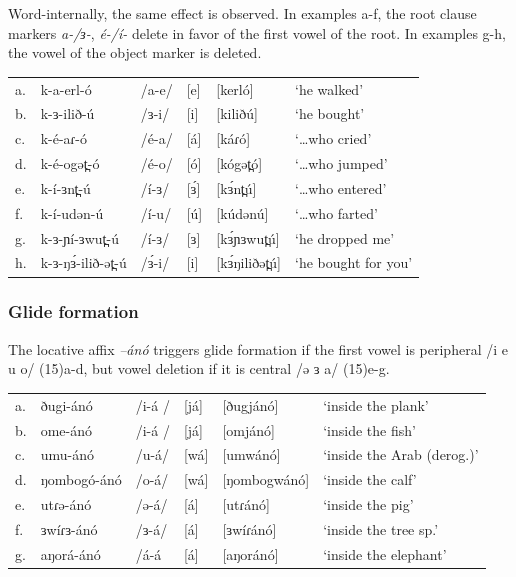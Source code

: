 Word-internally, the same effect is observed. In examples a-f, the root clause markers \textit{a-/ɜ-}, \textit{é-/í-} delete in favor of the first vowel of the root. In examples g-h, the vowel of the object marker is deleted. 

\begin{tabular}[t]{llllll}
a.&	k-a-erl-ó		&	/a-e/&	[e]	&	[kerló]		&	‘he walked’\\
b.&	k-ɜ-ilið-ú		&	/ɜ-i/&	[i]	&	[kiliðú]		&	‘he bought’\\
c.&	k-é-aɾ-ó		&	/é-a/&	[á]	&	[káɾó]		&	‘…who cried’	 \\
d.&	k-é-ogət̪-ó		&	/é-o/&	[ó]	&	[kógət̪ó]	&	‘…who jumped’\\
e.&	k-í-ɜnt̪-ú		&	/í-ɜ/&	[ɜ́]	&	[kɜ́nt̪ú]		&	‘…who entered’\\
f.&	k-í-udən-ú		&	/í-u/&	[ú]	&	[kúdənú]		&	‘…who farted’\\
g.&	k-ɜ-ɲí-ɜwut̪-ú	&	/í-ɜ/&	[ɜ]	&	[kɜ́ɲɜwut̪ú]	&	‘he dropped me’\\
h.&	k-ɜ-ŋɜ́-ilið-ət̪-ú&	/ɜ́-i/&	[i]	&	[kɜ́ŋiliðət̪ú]&	‘he bought for you’\\
\end{tabular}

\subsubsection{Glide formation}
The locative affix \textit{–ánó} triggers glide formation if the first vowel is peripheral /i e u o/ (15)a-d, but vowel deletion if it is central /ə ɜ a/ (15)e-g.

\ea
\begin{tabular}[t]{llllll}
a.&	ðugi-ánó	&	/i-á /	&	[já]&	[ðugjánó]	&	‘inside the plank’\\
b.&	ome-ánó		&	/i-á / 	&	[já]&	[omjánó]		&	‘inside the fish’\\
c.&	umu-ánó		&	/u-á/	&	[wá]&	[umwánó]		&	‘inside the Arab (derog.)’\\
d.&	ŋombogó-ánó	&	/o-á/	&	[wá]&	[ŋombogwánó]&	‘inside the calf’\\
e.&	utɾə-ánó	&	/ə-á/	&	[á]	&	[utɾánó]	&	‘inside the pig’\\
f.&	ɜwíɾɜ-ánó	&	/ɜ-á/	&	[á]	&	[ɜwíɾánó]	&	‘inside the tree sp.’\\
g.&	aŋorá-ánó	&	/á-á		&	[á]	&	[aŋoránó]	&	‘inside the elephant’\\
\end{tabular}
\z

